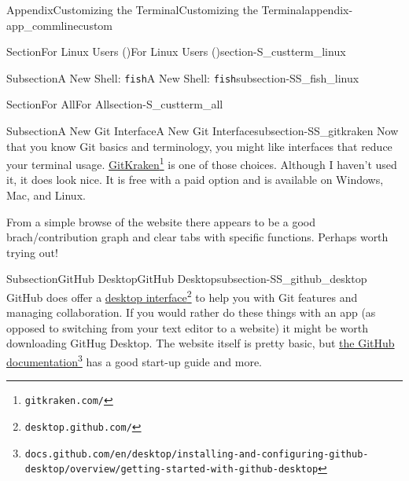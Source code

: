 \documentclass[twoside,10pt,]{book}
\newcommand{\mono}[1]{\texttt{#1}}
\begin{document}
\begin{appendixptx}{Appendix}{Customizing the Terminal}{}{Customizing the Terminal}{}{}{appendix-app_commlinecustom}
\begin{sectionptx}{Section}{For Linux Users (\textasteriskcentered{})}{}{For Linux Users (\textasteriskcentered{})}{}{}{section-S_custterm_linux}
\begin{subsectionptx}{Subsection}{A New Shell: \mono{fish}}{}{A New Shell: \mono{fish}}{}{}{subsection-SS_fish_linux}
\end{subsectionptx}
\end{sectionptx}
%
%
\typeout{************************************************}
\typeout{************************************************}
%
\begin{sectionptx}{Section}{For All}{}{For All}{}{}{section-S_custterm_all}
%
%
\typeout{************************************************}
\typeout{************************************************}
%
\begin{subsectionptx}{Subsection}{A New Git Interface}{}{A New Git Interface}{}{}{subsection-SS_gitkraken}
%
%
Now that you know Git basics and terminology, you might like interfaces that reduce your terminal usage. \href{https://www.gitkraken.com/}{GitKraken}\footnote{\nolinkurl{gitkraken.com/}\label{fn-SS_gitkraken-d-b}} is one of those choices. Although I haven't used it, it does look nice. It is free with a paid option and is available on Windows, Mac, and Linux.%
\par
From a simple browse of the website there appears to be a good brach\slash{}contribution graph and clear tabs with specific functions. Perhaps worth trying out!%
\end{subsectionptx}
%
%
\typeout{************************************************}
\typeout{************************************************}
%
\begin{subsectionptx}{Subsection}{GitHub Desktop}{}{GitHub Desktop}{}{}{subsection-SS_github_desktop}
%
%
GitHub does offer a \href{https://desktop.github.com/}{desktop interface}\footnote{\nolinkurl{desktop.github.com/}\label{fn-SS_github_desktop-d-b}} to help you with Git features and managing collaboration. If you would rather do these things with an app (as opposed to switching from your text editor to a website) it might be worth downloading GitHug Desktop. The website itself is pretty basic, but \href{https://docs.github.com/en/desktop/installing-and-configuring-github-desktop/overview/getting-started-with-github-desktop}{the GitHub documentation}\footnote{\nolinkurl{docs.github.com/en/desktop/installing-and-configuring-github-desktop/overview/getting-started-with-github-desktop}\label{fn-SS_github_desktop-d-d}} has a good start-up guide and more.%
\end{subsectionptx}
%
%
\typeout{************************************************}

\end{sectionptx}
\end{appendixptx}
\end{document}
